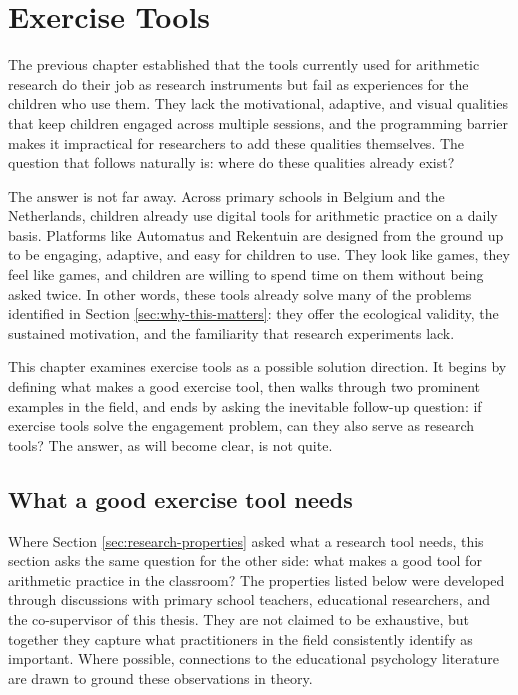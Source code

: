 \chapter{Exercise Tools}
\label{chp:exercise-tools}
The previous chapter established that the tools currently used for arithmetic research do their job as research instruments but fail as experiences for the children who use them. They lack the motivational, adaptive, and visual qualities that keep children engaged across multiple sessions, and the programming barrier makes it impractical for researchers to add these qualities themselves. The question that follows naturally is: where do these qualities already exist?

The answer is not far away. Across primary schools in Belgium and the Netherlands, children already use digital tools for arithmetic practice on a daily basis. Platforms like Automatus \cite{automatus} and Rekentuin \cite{rekentuin} are designed from the ground up to be engaging, adaptive, and easy for children to use. They look like games, they feel like games, and children are willing to spend time on them without being asked twice. In other words, these tools already solve many of the problems identified in Section \ref{sec:why-this-matters}: they offer the ecological validity, the sustained motivation, and the familiarity that research experiments lack.

This chapter examines exercise tools as a possible solution direction. It begins by defining what makes a good exercise tool, then walks through two prominent examples in the field, and ends by asking the inevitable follow-up question: if exercise tools solve the engagement problem, can they also serve as research tools? The answer, as will become clear, is not quite.

\section{What a good exercise tool needs}
\label{sec:exercise-properties}
Where Section \ref{sec:research-properties} asked what a research tool needs, this section asks the same question for the other side: what makes a good tool for arithmetic practice in the classroom? The properties listed below were developed through discussions with primary school teachers, educational researchers, and the co-supervisor of this thesis. They are not claimed to be exhaustive, but together they capture what practitioners in the field consistently identify as important. Where possible, connections to the educational psychology literature are drawn to ground these observations in theory.

